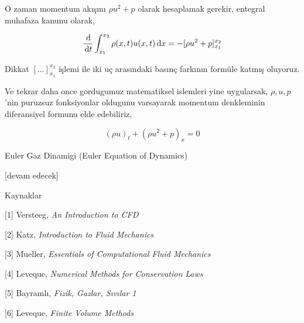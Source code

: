 \documentclass[12pt,fleqn]{article}\usepackage{../../common}
\begin{document}
O zaman momentum akışını $\rho u^2 + p$ olarak hesaplamak gerekir, entegral
muhafaza kanunu olarak,

$$
\frac{\,\mathrm{d}}{\,\mathrm{d} t} \int _{x_1}^{x_2} 
\rho(x,t) u(x,t) \,\mathrm{d} x = - [\rho u^2 + p] _{x_1}^{x_2}
$$

Dikkat $[\hdots]_{x_1}^{x_2}$ işlemi ile iki uç arasındaki basınç farkının
formüle katmış oluyoruz.

Ve tekrar daha once gordugumuz matematiksel islemleri yine uygularsak,
$\rho,u,p$'nin puruzsuz fonksiyonlar oldugunu varsayarak momentum denkleminin
diferansiyel formunu elde edebiliriz,

$$
(\rho u)_t + (\rho u^2 + p)_x = 0
$$









Euler Gaz Dinamigi (Euler Equation of Dynamics)

[devam edecek]

Kaynaklar

[1] Versteeg, {\em An Introduction to CFD}

[2] Katz, {\em Introduction to Fluid Mechanics}

[3] Mueller, {\em Essentials of Computational Fluid Mechanics}

[4] Leveque, {\em Numerical Methods for Conservation Laws}

[5] Bayramlı, {\em Fizik, Gazlar, Sıvılar 1}

[6] Leveque, {\em Finite Volume Methods}
\end{document}
